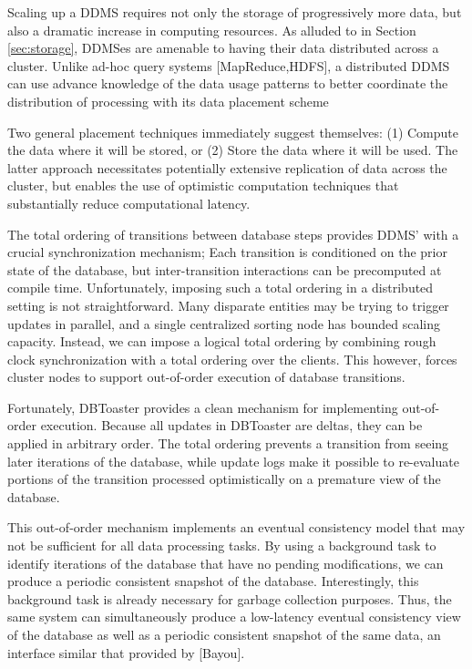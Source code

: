 Scaling up a DDMS requires not only the storage of progressively more data, but also a dramatic increase in computing resources.  As alluded to in Section \ref{sec:storage}, DDMSes are amenable to having their data distributed across a cluster.  Unlike ad-hoc query systems [MapReduce,HDFS], a distributed DDMS can use advance knowledge of the data usage patterns to better coordinate the distribution of processing with its data placement scheme

Two general placement techniques immediately suggest themselves: (1) Compute the data where it will be stored, or (2) Store the data where it will be used.  The latter approach necessitates potentially extensive replication of data across the cluster, but enables the use of optimistic computation techniques that substantially reduce computational latency.

The total ordering of transitions between database steps provides DDMS' with a crucial synchronization mechanism; Each transition is conditioned on the prior state of the database, but inter-transition interactions can be precomputed at compile time.  Unfortunately, imposing such a total ordering in a distributed setting is not straightforward.  Many disparate entities may be trying to trigger updates in parallel, and a single centralized sorting node has bounded scaling capacity.  Instead, we can impose a logical total ordering by combining rough clock synchronization with a total ordering over the clients.  This however, forces cluster nodes to support out-of-order execution of database transitions.

Fortunately, DBToaster provides a clean mechanism for implementing out-of-order execution.  Because all updates in DBToaster are deltas, they can be applied in arbitrary order.  The total ordering prevents a transition from seeing later iterations of the database, while update logs make it possible to re-evaluate portions of the transition processed optimistically on a premature view of the database.  

This out-of-order mechanism implements an eventual consistency model that may not be sufficient for all data processing tasks.  By using a background task to identify iterations of the database that have no pending modifications, we can produce a periodic consistent snapshot of the database.  Interestingly, this background task is already necessary for garbage collection purposes.  Thus, the same system can simultaneously produce a low-latency eventual consistency view of the database as well as a periodic consistent snapshot of the same data, an interface similar that provided by [Bayou].